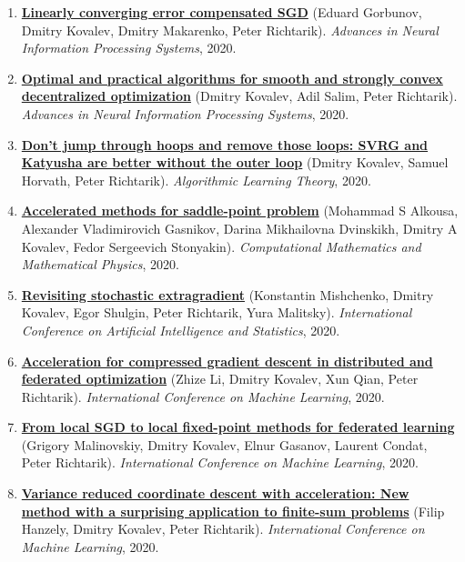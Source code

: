 \begin{enumerate}
\item
\textbf{\href{https://proceedings.neurips.cc/paper_files/paper/2020/hash/ef9280fbc5317f17d480e4d4f61b3751-Abstract.html}{Linearly converging error compensated SGD}} (Eduard Gorbunov, Dmitry Kovalev, Dmitry Makarenko, Peter Richtarik). \textit{Advances in Neural Information Processing Systems}, 2020.
\item
\textbf{\href{https://proceedings.neurips.cc/paper_files/paper/2020/hash/d530d454337fb09964237fecb4bea6ce-Abstract.html}{Optimal and practical algorithms for smooth and strongly convex decentralized optimization}} (Dmitry Kovalev, Adil Salim, Peter Richtarik). \textit{Advances in Neural Information Processing Systems}, 2020.
\item
\textbf{\href{https://proceedings.mlr.press/v117/kovalev20a.html}{Don’t jump through hoops and remove those loops: SVRG and Katyusha are better without the outer loop}} (Dmitry Kovalev, Samuel Horvath, Peter Richtarik). \textit{Algorithmic Learning Theory}, 2020.
\item
\textbf{\href{https://link.springer.com/article/10.1134/S0965542520110020}{Accelerated methods for saddle-point problem}} (Mohammad S Alkousa, Alexander Vladimirovich Gasnikov, Darina Mikhailovna Dvinskikh, Dmitry A Kovalev, Fedor Sergeevich Stonyakin). \textit{Computational Mathematics and Mathematical Physics}, 2020.
\item
\textbf{\href{http://proceedings.mlr.press/v108/mishchenko20a}{Revisiting stochastic extragradient}} (Konstantin Mishchenko, Dmitry Kovalev, Egor Shulgin, Peter Richtarik, Yura Malitsky). \textit{International Conference on Artificial Intelligence and Statistics}, 2020.
\item
\textbf{\href{https://proceedings.mlr.press/v119/li20g.html}{Acceleration for compressed gradient descent in distributed and federated optimization}} (Zhize Li, Dmitry Kovalev, Xun Qian, Peter Richtarik). \textit{International Conference on Machine Learning}, 2020.
\item
\textbf{\href{http://proceedings.mlr.press/v119/malinovskiy20a.html}{From local SGD to local fixed-point methods for federated learning}} (Grigory Malinovskiy, Dmitry Kovalev, Elnur Gasanov, Laurent Condat, Peter Richtarik). \textit{International Conference on Machine Learning}, 2020.
\item
\textbf{\href{https://proceedings.mlr.press/v119/hanzely20b.html}{Variance reduced coordinate descent with acceleration: New method with a surprising application to finite-sum problems}} (Filip Hanzely, Dmitry Kovalev, Peter Richtarik). \textit{International Conference on Machine Learning}, 2020.

\end{enumerate}
